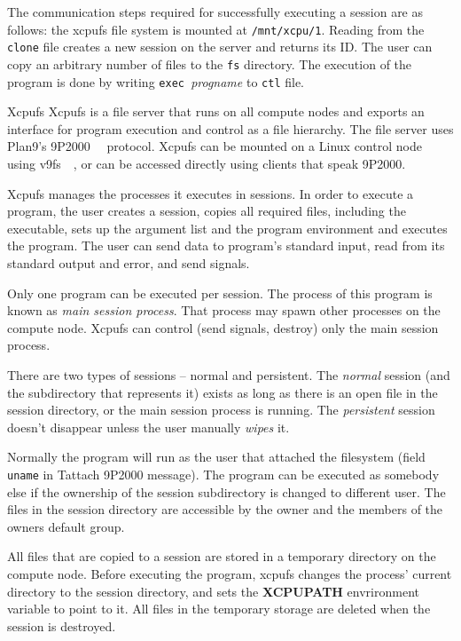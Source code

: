 \documentclass[11pt]{p9article}
\makeatletter
\renewcommand\section{\@startsection {section}{1}{\z@} {3pt} {1pt} {\normalfont\normalsize\bfseries}}
\makeatother
\begin{document}
The communication steps required for successfully executing a session
are as follows: the xcpufs file system is mounted at \verb|/mnt/xcpu/1|.
Reading from the \verb|clone| file creates a new session on the server and returns
its ID. The user can copy an arbitrary number of files to the
\verb|fs| directory. The execution of the program is done by writing
\verb|exec |{\sl progname} to \verb|ctl| file.

\section{Xcpufs}
Xcpufs is a file server that runs on all compute nodes and exports an
interface for program execution and control as a file hierarchy. The file
server uses Plan9's 9P2000~\cite{9p}~\cite{graverobbers} protocol. Xcpufs can be mounted on a Linux
control node using v9fs~\cite{minnich-vfs}~\cite{v9fseric}, or can be accessed directly using clients that
speak 9P2000.

Xcpufs manages the processes it executes in sessions. In order to execute a
program, the user creates a session, copies all required files, including
the executable, sets up the argument list and the program environment and
executes the program. The user can send data to program's standard input,
read from its standard output and error, and send signals.

Only one program can be executed per session. The process of this program is
known as {\sl main session process}. That process may spawn other processes
on the compute node. Xcpufs can control (send signals, destroy) only the
main session process. 

There are two types of sessions -- normal and persistent. The {\sl normal}
session (and the subdirectory that represents it) exists as long as there is
an open file in the session directory, or the main session process is
running. The {\sl persistent} session doesn't disappear unless the user
manually {\sl wipes} it. 

Normally the program will run as the user that attached the filesystem
(field \verb|uname| in Tattach 9P2000 message). The program can be executed
as somebody else if the ownership of the session subdirectory is changed to
different user. The files in the session directory are accessible by the
owner and the members of the owners default group.

All files that are copied to a session are stored in a temporary directory
on the compute node. Before executing the program, xcpufs changes the
process' current directory to the session directory, and sets the \textbf{XCPUPATH}
envrironment variable to point to it. All files in the temporary storage are
deleted when the session is destroyed.
\end{document}
